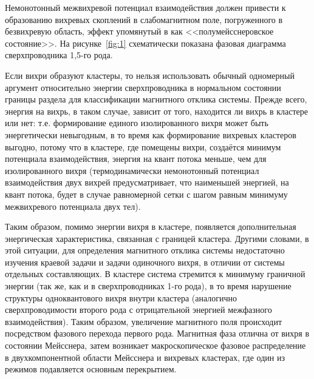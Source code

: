 Немонотонный межвихревой потенциал взаимодействия должен привести к 
образованию вихревых скоплений в слабомагнитном поле, погруженного в 
безвихревую область, эффект упомянутый в \cite{bib:1} как 
<<полумейсснеровское состояние>>. На рисунке~\ref{fig:1} схематически 
показана фазовая диаграмма сверхпроводника 1,5-го рода.

Если вихри образуют кластеры, то нельзя использовать обычный одномерный 
аргумент относительно энергии сверхпроводника в нормальном состоянии границы 
раздела для классификации магнитного отклика системы. Прежде всего, энергия 
на вихрь, в таком случае, зависит от того, находится ли вихрь в кластере или 
нет: т.е. формирование единого изолированного вихря может быть энергетически 
невыгодным, в то время как формирование вихревых кластеров выгодно, потому что 
в кластере, где помещены вихри, создаётся минимум потенциала взаимодействия, 
энергия на квант потока меньше, чем для изолированного вихря (термодинамически 
немонотонный потенциал взаимодействия двух вихрей предусматривает, что 
наименьшей энергией, на квант потока, будет в случае равномерной сетки с шагом 
равным минимуму межвихревого потенциала двух тел).

Таким образом, помимо энергии вихря в кластере, появляется дополнительная 
энергическая характеристика, связанная с границей кластера. Другими словами, в 
этой ситуации, для определения магнитного отклика системы недостаточно 
изучения краевой задачи и задачи одиночного вихря, в отличии от системы 
отдельных составляющих. В кластере система стремится к минимуму граничной 
энергии (так же, как и в сверхпроводниках 1-го рода), в то время нарушение 
структуры одноквантового вихря внутри кластера (аналогично сверхпроводимости 
второго рода с отрицательной энергией межфазного взаимодействия). Таким 
образом, увеличение магнитного поля происходит посредством фазового перехода 
первого рода. Магнитная фаза отлична от вихря в состоянии Мейсснера, затем 
возникает макроскопическое фазовое распределение в двухкомпонентной области 
Мейсснера и вихревых кластерах, где один из режимов подавляется основным 
перекрытием. \cite{bib:main}

\newpage